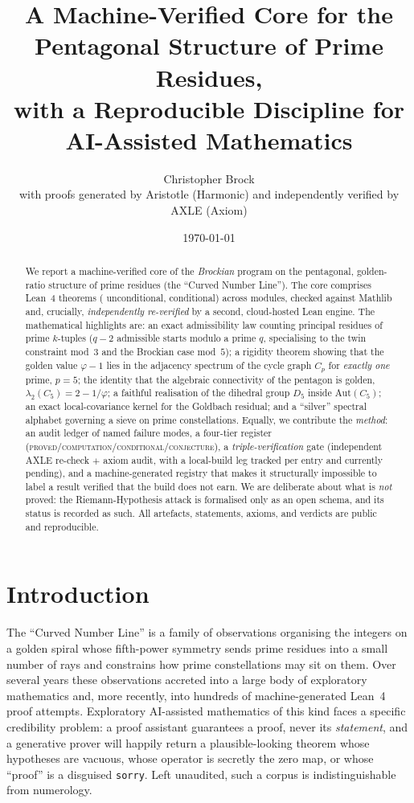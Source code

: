 \documentclass[11pt]{article}
\title{\bf A Machine-Verified Core for the Pentagonal Structure of Prime Residues,\\
with a Reproducible Discipline for AI-Assisted Mathematics}
\author{Christopher Brock\\ \small with proofs generated by Aristotle (Harmonic) and independently verified by AXLE (Axiom)}
\date{\today}
\theoremstyle{definition}
\theoremstyle{remark}
\newcommand{\phigr}{\varphi}
\begin{document}
\maketitle

\begin{abstract}
We report a machine-verified core of the \emph{Brockian} program on the pentagonal,
golden-ratio structure of prime residues (the ``Curved Number Line''). The core comprises
\nTheorems{} Lean~4 theorems (\nProved{} unconditional, \nConditional{} conditional) across
\nModules{} modules, checked against Mathlib and, crucially, \emph{independently re-verified}
by a second, cloud-hosted Lean engine. The mathematical highlights are: an exact
admissibility law counting principal residues of prime $k$-tuples ($q-2$ admissible starts
modulo a prime $q$, specialising to the twin constraint mod~$3$ and the Brockian case mod~$5$);
a rigidity theorem showing that the golden value $\phigr-1$ lies in the adjacency spectrum of
the cycle graph $C_p$ for \emph{exactly one} prime, $p=5$; the identity that the algebraic
connectivity of the pentagon is golden, $\lambda_2(C_5)=2-1/\phigr$; a faithful realisation of
the dihedral group $D_5$ inside $\mathrm{Aut}(C_5)$; an exact local-covariance kernel for the
Goldbach residual; and a ``silver'' spectral alphabet governing a sieve on prime constellations.
Equally, we contribute the \emph{method}: an audit ledger of named failure modes, a four-tier
register (\textsc{proved}/\textsc{computation}/\textsc{conditional}/\textsc{conjecture}), a
\emph{triple-verification} gate (independent AXLE re-check $+$ axiom audit, with a
local-build leg tracked per entry and currently pending), and a
machine-generated registry that makes it structurally impossible to label a result verified
that the build does not earn. We are deliberate about what is \emph{not} proved: the
Riemann-Hypothesis attack is formalised only as an open schema, and its status is recorded as
such. All artefacts, statements, axioms, and verdicts are public and reproducible.
\end{abstract}

\section{Introduction}

The ``Curved Number Line'' is a family of observations organising the integers on a golden
spiral whose fifth-power symmetry sends prime residues into a small number of rays and
constrains how prime constellations may sit on them. Over several years these observations
accreted into a large body of exploratory mathematics and, more recently, into hundreds of
machine-generated Lean~4 proof attempts. Exploratory AI-assisted mathematics of this kind
faces a specific credibility problem: a proof assistant guarantees a proof, never its
\emph{statement}, and a generative prover will happily return a plausible-looking theorem whose
hypotheses are vacuous, whose operator is secretly the zero map, or whose ``proof'' is a
disguised \texttt{sorry}. Left unaudited, such a corpus is indistinguishable from numerology.
\end{document}
